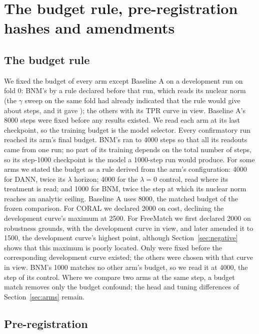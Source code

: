 \section{The budget rule, pre-registration hashes and amendments}
\label{sec:hashes}

\subsection{The budget rule}
\label{sec:budget-detail}

We fixed the budget of every arm except Baseline A on a development run on fold 0: BNM's by a
rule declared before that run, which reads its nuclear norm (the $\gamma$ sweep on the same fold
had already indicated that the rule would give about \bnmBudgetPreview{} steps, and it gave
\bnmBudgetSteps{}); the others with its TPR curve in view. Baseline A's 8000 steps were fixed before any results existed. We read each arm at its
last checkpoint, so the training budget is the model selector. Every confirmatory run
reached its arm's final budget. BNM's ran to 4000 steps so that all its readouts came from one
run; no part of its training depends on the total number of steps, so its step-1000 checkpoint
is the model a 1000-step run would produce. For some arms we stated the budget as a rule derived
from the arm's configuration: 4000 for DANN, twice its $\lambda$
horizon; 4000 for the $\lambda=0$ control, read where its treatment is read; and 1000 for BNM,
twice the step at which its nuclear norm reaches an analytic ceiling. Baseline A uses 8000, the
matched budget of the frozen comparison. For CORAL we declared 2000 on cost, declining the
development curve's maximum at 2500. For FreeMatch we first declared 2000 on robustness
grounds, with the development curve in view, and later amended it to 1500, the development
curve's highest point, although Section~\ref{sec:negative} shows that this maximum is poorly
located. Only \rwBudgetPreCurve{} were fixed before the corresponding
development curve existed; the others were chosen with that curve in view. BNM's 1000 matches
no other arm's budget, so we read it at 4000, the step of its control. Where we compare two arms
at the same step, a budget match removes only the budget confound; the head and tuning
differences of Section~\ref{sec:arms} remain.

\subsection{Pre-registration}
\label{sec:prereg-detail}

